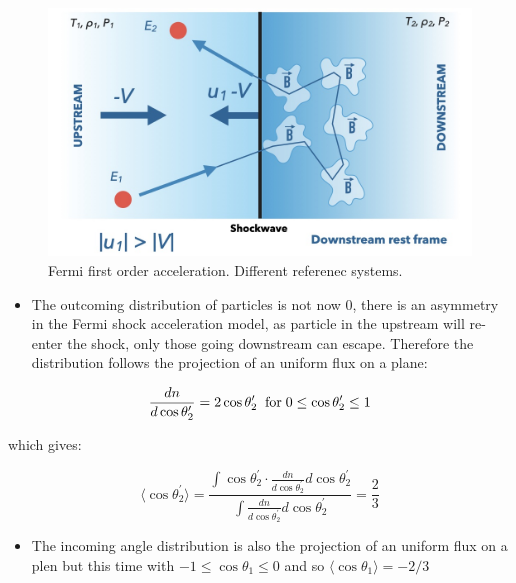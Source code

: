 \documentclass[
  letterpaper,
  DIV=11,
  numbers=noendperiod]{scrreprt}
\providecommand{\tightlist}{%
  \setlength{\itemsep}{0pt}\setlength{\parskip}{0pt}}\usepackage{longtable,booktabs,array}
\begin{document}
\begin{figure}
\begin{minipage}{0.33\linewidth}
{\includegraphics{images/fermi-ds-ref.jpg}

}


\end{minipage}%

\caption{\label{fig-fermi1st}Fermi first order acceleration. Different
referenec systems.}

\end{figure}%

\begin{itemize}
\tightlist
\item
  The outcoming distribution of particles is not now 0, there is an
  asymmetry in the Fermi shock acceleration model, as particle in the
  upstream will re-enter the shock, only those going downstream can
  escape. Therefore the distribution follows the projection of an
  uniform flux on a plane:
\end{itemize}

\[\frac{dn}{d\cos \theta_2^\prime} = 2 \cos\theta_2^\prime{\;\; \rm for\;  0 \leq \cos\theta_2^\prime \leq 1}\]

which gives:

\[\langle \cos\theta_2^\prime\rangle = \frac{\int \cos\theta_2^\prime \cdot \frac{dn}{d\cos\theta_2^\prime} d\cos\theta_2^\prime}{\int \frac{dn}{d\cos\theta_2^\prime}d\cos\theta_2^\prime} = \frac{2}{3}\]

\begin{itemize}
\tightlist
\item
  The incoming angle distribution is also the projection of an uniform
  flux on a plen but this time with \(-1 \leq \cos\theta_1 \leq 0\) and
  so \(\langle \cos \theta_1 \rangle = -2/3\)
\end{itemize}
\end{document}

